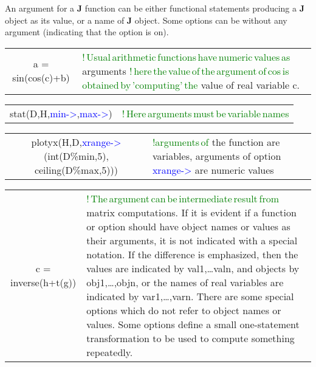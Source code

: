  An argument for a \textbf{J} function can be either functional statements producing a \textbf{J} object as its
 value, or a name of \textbf{J} object. Some options can be without any argument (indicating that the
 option is on).
\begin{table}[H]
\label{hopo}
\begin{tabularx}{\textwidth}{ c  X }
 a = \textcolor{VioletRed}{sin}(\textcolor{VioletRed}{cos}(c)+b) &\textcolor{green}{!\,Usual\,arithmetic\,functions\,have\,numeric\,values\,as}
 arguments
 \textcolor{green}{!\,here\,the\,value\,of\,the\,argument\,of\,cos\,is\,obtained\,by\,'computing'\,the}
 value of real variable c.
\end{tabularx}
\end{table}
\vspace{-1.51em}
\begin{table}[H]
\label{hopo2}
\begin{tabularx}{\textwidth}{ c  X }
 \textcolor{VioletRed}{stat}(D,H,\textcolor{blue}{min->},\textcolor{blue}{max->}) &\textcolor{green}{!\,Here\,arguments\,must\,be\,variable\,names}
\end{tabularx}
\end{table}
\vspace{-1.51em}
\begin{table}[H]
\label{hopo3}
\begin{tabularx}{\textwidth}{ c  X }
 \textcolor{VioletRed}{plotyx}(H,D,\textcolor{blue}{xrange->}(\textcolor{VioletRed}{int}(D\%min,5), \textcolor{VioletRed}{ceiling}(D\%max,5))) &\textcolor{green}{!arguments\,of}
 the function are variables, arguments of option \textcolor{blue}{xrange->} are numeric
 values
\end{tabularx}
\end{table}
\vspace{-1.51em}
\begin{table}[H]
\label{hopo4}
\begin{tabularx}{\textwidth}{ c  X }
 c = \textcolor{VioletRed}{inverse}(h+\textcolor{VioletRed}{t}(g)) &\textcolor{green}{!\,The\,argument\,can\,be\,intermediate\,result\,from}
 matrix computations.
 If it is evident if a function or option should have object names or values as their arguments, it
 is not indicated with a special notation. If the difference is emphasized, then the values are
 indicated by val1,…valn, and objects by obj1,…,objn, or the names of real variables are
 indicated by var1,…,varn.
 There are some special options which do not refer to object names or values. Some options
 define a small one-statement transformation to be used to compute something repeatedly.
\end{tabularx}
\end{table}
